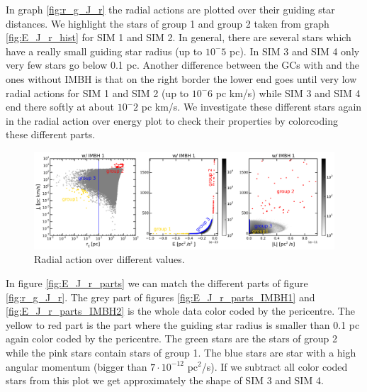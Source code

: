 In graph \ref{fig:r_g_J_r} the radial actions are plotted over their guiding star distances. We highlight the stars of group 1 and group 2 taken from graph \ref{fig:E_J_r_hist} for SIM 1 and SIM 2. In general, there are several stars which have a really small guiding star radius (up to \(10^-5\) pc). In SIM 3 and SIM 4 only very few stars go below 0.1 pc. Another difference between the \acp{GC} with and the ones without \ac{IMBH} is that on the right border the lower end goes until very low radial actions for SIM 1 and SIM 2 (up to \(10^-6\) pc km/s) while SIM 3 and SIM 4 end there softly at about \(10^-2\) pc km/s. We investigate these different stars again in the radial action over energy plot to check their properties by colorcoding these different parts.

\begin{figure}
\centering
\includegraphics[width=\textwidth]{Plots/J_r_compare_plot.png}
\caption{Radial action over different values.}
\label{fig:J_r_compare}
\end{figure}
In figure \ref{fig:E_J_r_parts} we can match the different parts of figure \ref{fig:r_g_J_r}. The grey part of figures \ref{fig:E_J_r_parts_IMBH1} and \ref{fig:E_J_r_parts_IMBH2} is the whole data color coded by the pericentre. The yellow to red part is the part where the guiding star radius is smaller than 0.1 pc again color coded by the pericentre. The green stars are the stars of group 2 while the pink stars contain stars of group 1. The blue stars are star with a high angular momentum (bigger than \(7\cdot 10^{-12}\) pc\(^2\)/s). If we subtract all color coded stars from this plot we get approximately the shape of SIM 3 and SIM 4. 
